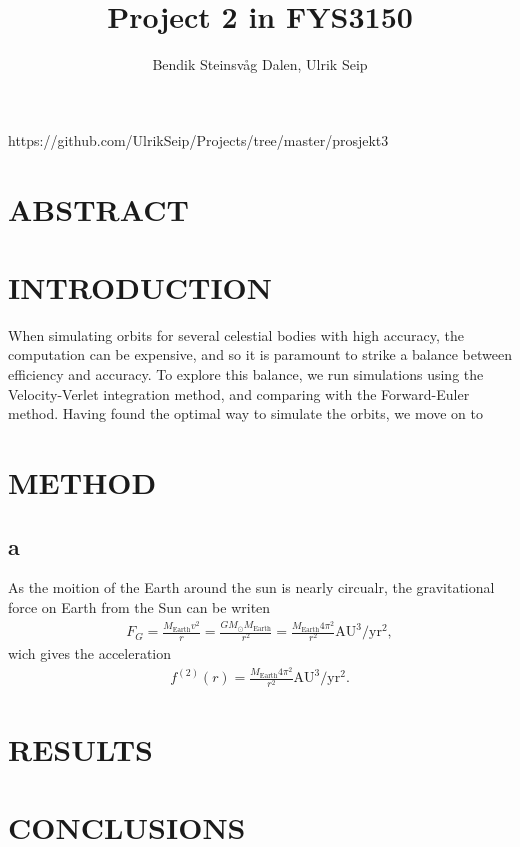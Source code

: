 \documentclass[a4paper]{article}
\title{Project 2 in FYS3150}
\author{Bendik Steinsvåg Dalen, Ulrik Seip}
\begin{document}
\maketitle

https://github.com/UlrikSeip/Projects/tree/master/prosjekt3

\section{ABSTRACT}


\section{INTRODUCTION}
When simulating orbits for several celestial bodies with high accuracy, the computation can be expensive, and so it is paramount to strike a balance between efficiency and accuracy. To explore this balance, we run simulations using the Velocity-Verlet integration method, and comparing with the Forward-Euler method. Having found the optimal way to simulate the orbits, we move on to


\section{METHOD}
\subsection{a}
As the moition of the Earth around the sun is nearly circualr, the gravitational force on Earth from the Sun can be writen
\begin{align}
F_{G} = \frac{M_{\text{Earth}}v^{2}}{r} = \frac{GM_{\odot} M_{\text{Earth}}}{r^{2}} = \frac{M_{\text{Earth}} 4\pi ^{2}}{r^{2}}  \mathrm{AU}^{3}/ \mathrm{yr}^{2},
\end{align}
wich gives the acceleration
\begin{align*}
f^{(2)}(r) = \frac{M_{\text{Earth}} 4\pi ^{2} }{r^{2}} \mathrm{AU}^{3}/ \mathrm{yr}^{2}.
\end{align*}



\section{RESULTS}


\section{CONCLUSIONS}
\end{document}
